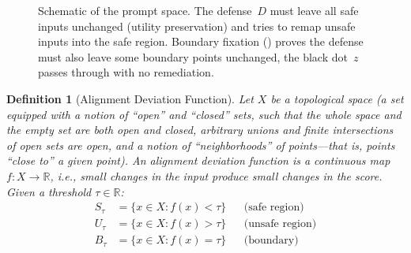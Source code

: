 \documentclass[11pt]{article}
\newtheorem{definition}[theorem]{Definition}
\newcommand{\R}{\mathbb{R}}
\begin{document}
\begin{figure}[t]
\centering
{}
\caption{Schematic of the prompt space. The defense~$D$ must leave all
safe inputs unchanged (utility preservation) and tries to remap unsafe
inputs into the safe region. Boundary fixation () proves
the defense must also leave some boundary points unchanged, the black
dot~$z$ passes through with no remediation.}
\label{fig:landscape}
\end{figure}

\begin{definition}[Alignment Deviation Function]
\label{def:ad}
Let $X$ be a topological space (a set equipped with a notion of
``open'' and ``closed'' sets, such that the whole space and the empty
set are both open and closed, arbitrary unions and finite intersections
of open sets are open, and a notion of ``neighborhoods'' of points---that
is, points ``close to'' a given point). An \emph{alignment deviation function} is
a continuous map $f\colon X \to \R$, i.e., small changes in the
input produce small changes in the score. Given a threshold
$\tau\in\R$:
\begin{align}
  S_\tau &= \{x \in X : f(x) < \tau\}  &&\text{(safe region)} \\
  U_\tau &= \{x \in X : f(x) > \tau\}  &&\text{(unsafe region)} \\
  B_\tau &= \{x \in X : f(x) = \tau\}  &&\text{(boundary)}
\end{align}
\end{definition}
\end{document}
